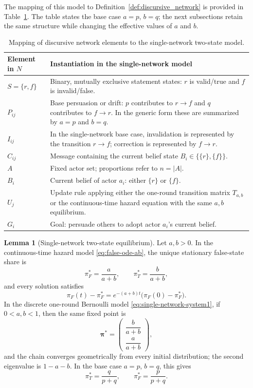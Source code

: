 \documentclass[12pt]{article}
\theoremstyle{definition}
\newtheorem{lemma}{Lemma}[section]
\begin{document}
The mapping of this model to Definition~\ref{def:discursive_network} is provided
in Table~\ref{tab:Single-Network-Dual-State}.  The table states the base case
$a=p$, $b=q$; the next subsections retain the same structure while changing the
effective values of $a$ and $b$.

\begin{table}[htbp]
    \centering
    \setlength{\tabcolsep}{6pt}
    \renewcommand{\arraystretch}{1.15}
    \caption{Mapping of discursive network elements to the single-network two-state model.}
    \label{tab:Single-Network-Dual-State}
    \begin{tabularx}{6.5in}{@{}lX@{}}
    \toprule
    \textbf{Element in $N$} & \textbf{Instantiation in the single-network model} \\
    \midrule
    $S=\{r,f\}$ & Binary, mutually exclusive statement states: $r$ is valid/true and $f$ is invalid/false.\\
    $P_{ij}$ & Base persuasion or drift: $p$ contributes to $r\to f$ and $q$ contributes to $f\to r$.  In the generic form these are summarized by $a=p$ and $b=q$.\\
    $I_{ij}$ & In the single-network base case, invalidation is represented by the transition $r\to f$; correction is represented by $f\to r$.\\
    $C_{ij}$ & Message containing the current belief state $B_i\in\{\{r\},\{f\}\}$.\\
    $A$ & Fixed actor set; proportions refer to $n=|A|$.\\
    $B_i$ & Current belief of actor $a_i$: either $\{r\}$ or $\{f\}$.\\
    $U_j$ & Update rule applying either the one-round transition matrix $T_{a,b}$ or the continuous-time hazard equation with the same $a,b$ equilibrium.\\
    $G_i$ & Goal: persuade others to adopt actor $a_i$'s current belief.\\
    \bottomrule
    \end{tabularx}
\end{table}

\begin{lemma}[Single-network two-state equilibrium]
\label{lem:basic_invalidation}
Let $a,b>0$.  In the continuous-time hazard model
\eqref{eq:false-ode-ab}, the unique stationary false-state share is
\[
    \pi_F^*=\frac{a}{a+b},
    \qquad
    \pi_T^*=\frac{b}{a+b},
\]
and every solution satisfies
\[
    \pi_F(t)-\pi_F^*=e^{-(a+b)t}\bigl(\pi_F(0)-\pi_F^*\bigr).
\]
In the discrete one-round Bernoulli model \eqref{eq:single-network-system1}, if
$0<a,b<1$, then the same fixed point is
\[
\boldsymbol{\pi}^{*}
=
\begin{pmatrix}
\dfrac{b}{a+b}\\[6pt]
\dfrac{a}{a+b}
\end{pmatrix},
\]
and the chain converges geometrically from every initial distribution; the
second eigenvalue is $1-a-b$.  In the base case $a=p$, $b=q$, this gives
\[
\pi_T^*=\frac{q}{p+q},\qquad
\pi_F^*=\frac{p}{p+q}.
\]
\end{lemma}
\end{document}
